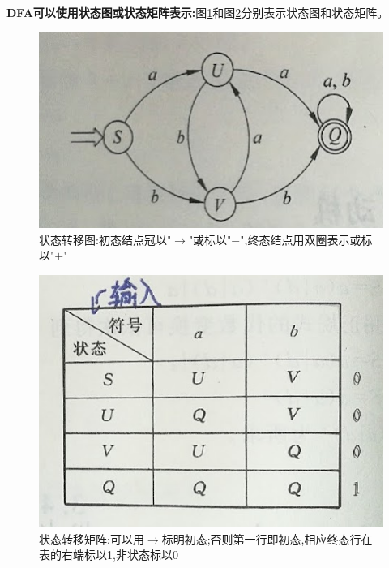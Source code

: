   \textbf{DFA可以使用状态图或状态矩阵表示:}图\ref{fig1}和图\ref{fig2}分别表示状态图和状态矩阵。

  \begin{figure}[H]
    \centering
    \includegraphics[scale = 0.3]{assets/CompilerConstructionPrinciples_5398e.png}
    \caption{状态转移图:初态结点冠以"$\rightarrow$"或标以"$-$",终态结点用双圈表示或标以"$+$"}
    \label{fig1}
  \end{figure}

  \begin{figure}[H]
    \centering
    \includegraphics[scale = 0.3]{assets/CompilerConstructionPrinciples_c1ff8.png}
    \caption{状态转移矩阵:可以用$\rightarrow$标明初态;否则第一行即初态,相应终态行在表的右端标以1,非状态标以0}
    \label{fig2}
  \end{figure}

